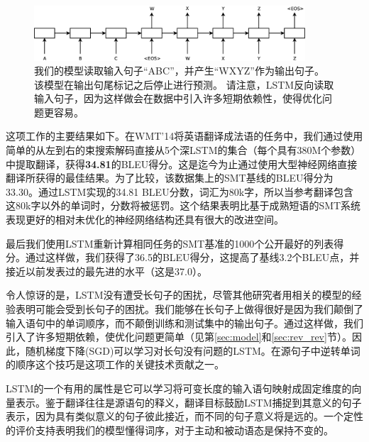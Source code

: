 
\begin{figure}[h]
\centering \includegraphics[width=0.9\textwidth]{Diagram1.eps}
\caption{\small 我们的模型读取输入句子“ABC”，并产生“WXYZ”作为输出句子。 该模型在输出句尾标记之后停止进行预测。 请注意，LSTM反向读取输入句子，因为这样做会在数据中引入许多短期依赖性，使得优化问题更容易。 }
\label{fig:translation-model2}
\end{figure}

这项工作的主要结果如下。在WMT'14将英语翻译成法语的任务中，我们通过使用简单的从左到右的束搜索解码直接从5个深LSTM的集合（每个具有380M个参数）中提取翻译，获得{\bf 34.81}的BLEU得分。这是迄今为止通过使用大型神经网络直接翻译所获得的最佳结果。为了比较，该数据集上的SMT基线的BLEU得分为33.30\cite{wmt14_en_fr}。通过LSTM实现的34.81 BLEU分数，词汇为80k字，所以当参考翻译包含这80k字以外的单词时，分数将被惩罚。这个结果表明比基于成熟短语的SMT系统表现更好的相对未优化的神经网络结构还具有很大的改进空间。

最后我们使用LSTM重新计算相同任务的SMT基准的1000个公开最好的列表得分\cite{wmt14_en_fr}。通过这样做，我们获得了36.5的BLEU得分，这提高了基线3.2个BLEU点，并接近以前发表过的最先进的水平（这是37.0\cite{durrani-EtAl:2014:W14-33}）。

令人惊讶的是，LSTM没有遭受长句子的困扰，尽管其他研究者用相关的模型的经验表明可能会受到长句子的困扰\cite{curse}。我们能够在长句子上做得很好是因为我们颠倒了输入语句中的单词顺序，而不颠倒训练和测试集中的输出句子。通过这样做，我们引入了许多短期依赖，使优化问题更简单（见第\ref{sec:model}和\ref{sec:rev_rev}节）。因此，随机梯度下降(SGD)可以学习对长句没有问题的LSTM。在源句子中逆转单词的顺序这个技巧是这项工作的关键技术贡献之一。

LSTM的一个有用的属性是它可以学习将可变长度的输入语句映射成固定维度的向量表示。鉴于翻译往往是源语句的释义，翻译目标鼓励LSTM捕捉到其意义的句子表示，因为具有类似意义的句子彼此接近，而不同的句子意义将是远的。一个定性的评价支持表明我们的模型懂得词序，对于主动和被动语态是保持不变的。
